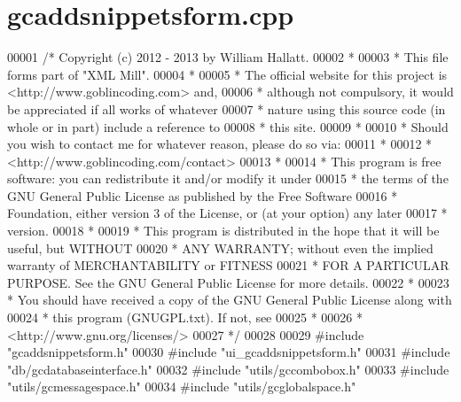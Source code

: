 \hypertarget{gcaddsnippetsform_8cpp_source}{\section{gcaddsnippetsform.\-cpp}
}

\begin{DoxyCode}
00001 \textcolor{comment}{/* Copyright (c) 2012 - 2013 by William Hallatt.}
00002 \textcolor{comment}{ *}
00003 \textcolor{comment}{ * This file forms part of "XML Mill".}
00004 \textcolor{comment}{ *}
00005 \textcolor{comment}{ * The official website for this project is <http://www.goblincoding.com> and,}
00006 \textcolor{comment}{ * although not compulsory, it would be appreciated if all works of whatever}
00007 \textcolor{comment}{ * nature using this source code (in whole or in part) include a reference to}
00008 \textcolor{comment}{ * this site.}
00009 \textcolor{comment}{ *}
00010 \textcolor{comment}{ * Should you wish to contact me for whatever reason, please do so via:}
00011 \textcolor{comment}{ *}
00012 \textcolor{comment}{ *                 <http://www.goblincoding.com/contact>}
00013 \textcolor{comment}{ *}
00014 \textcolor{comment}{ * This program is free software: you can redistribute it and/or modify it
       under}
00015 \textcolor{comment}{ * the terms of the GNU General Public License as published by the Free
       Software}
00016 \textcolor{comment}{ * Foundation, either version 3 of the License, or (at your option) any later}
00017 \textcolor{comment}{ * version.}
00018 \textcolor{comment}{ *}
00019 \textcolor{comment}{ * This program is distributed in the hope that it will be useful, but WITHOUT}
00020 \textcolor{comment}{ * ANY WARRANTY; without even the implied warranty of MERCHANTABILITY or
       FITNESS}
00021 \textcolor{comment}{ * FOR A PARTICULAR PURPOSE.  See the GNU General Public License for more
       details.}
00022 \textcolor{comment}{ *}
00023 \textcolor{comment}{ * You should have received a copy of the GNU General Public License along with}
00024 \textcolor{comment}{ * this program (GNUGPL.txt).  If not, see}
00025 \textcolor{comment}{ *}
00026 \textcolor{comment}{ *                    <http://www.gnu.org/licenses/>}
00027 \textcolor{comment}{ */}
00028 
00029 \textcolor{preprocessor}{#include "gcaddsnippetsform.h"}
00030 \textcolor{preprocessor}{#include "ui\_gcaddsnippetsform.h"}
00031 \textcolor{preprocessor}{#include "db/gcdatabaseinterface.h"}
00032 \textcolor{preprocessor}{#include "utils/gccombobox.h"}
00033 \textcolor{preprocessor}{#include "utils/gcmessagespace.h"}
00034 \textcolor{preprocessor}{#include "utils/gcglobalspace.h"}

\end{DoxyCode}
